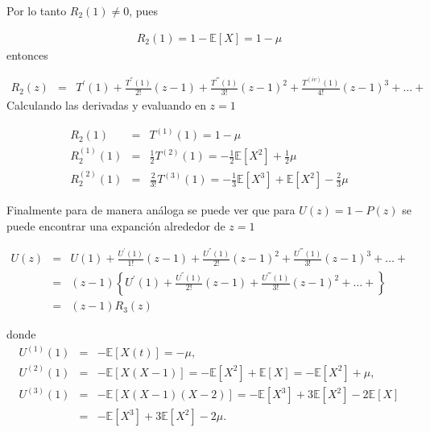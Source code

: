 \documentclass{article}
\newcommand{\esp}{\mathbb{E}}
\begin{document}
Por lo tanto $R_{2}\left(1\right)\neq0$, pues

\begin{eqnarray}\label{Eq.R2}
R_{2}\left(1\right)=1-\esp\left[X\right]=1-\mu
\end{eqnarray}
entonces

\begin{eqnarray}
R_{2}\left(z\right)&=&T^{'}\left(1\right)+\frac{T^{''}\left(1\right)}{2!}\left(z-1\right)+\frac{T^{'''}\left(1\right)}{3!}\left(z-1\right)^{2}+\frac{T^{(iv)}\left(1\right)}{4!}\left(z-1\right)^{3}+\ldots+
\end{eqnarray}
Calculando las derivadas y evaluando en $z=1$

\begin{eqnarray}
R_{2}\left(1\right)&=&T^{(1)}\left(1\right)=1-\mu\\
R_{2}^{(1)}\left(1\right)&=&\frac{1}{2}T^{(2)}\left(1\right)=-\frac{1}{2}\esp\left[X^{2}\right]+\frac{1}{2}\mu\\
R_{2}^{(2)}\left(1\right)&=&\frac{2}{3!}T^{(3)}\left(1\right)
=-\frac{1}{3}\esp\left[X^{3}\right]+\esp\left[X^{2}\right]-\frac{2}{3}\mu
\end{eqnarray}

Finalmente para de manera an\'aloga se puede ver que para $U\left(z\right)=1-P\left(z\right)$ se puede encontrar una expanci\'on alrededor de $z=1$

\begin{eqnarray*}
U\left(z\right)&=&U\left(1\right)+\frac{U^{'}\left(1\right)}{1!}\left(z-1\right)+\frac{U^{''}\left(1\right)}{2!}\left(z-1\right)^{2}+\frac{U^{'''}\left(1\right)}{3!}\left(z-1\right)^{3}+\ldots+\\
&=&\left(z-1\right)\left\{U^{'}\left(1\right)+\frac{U^{''}\left(1\right)}{2!}\left(z-1\right)+\frac{U^{'''}\left(1\right)}{3!}\left(z-1\right)^{2}+\ldots+\right\}\\
&=&\left(z-1\right)R_{3}\left(z\right)
\end{eqnarray*}

donde 
\begin{eqnarray*}
U^{(1)}\left(1\right)&=&-\esp\left[X\left(t\right)\right]=-\mu,\\ U^{(2)}\left(1\right)&=&-\esp\left[X\left(X-1\right)\right]
=-\esp\left[X^{2}\right]+\esp\left[X\right]=-\esp\left[X^{2}\right]+\mu,\\
U^{(3)}\left(1\right)&=&-\esp\left[X\left(X-1\right)\left(X-2\right)\right]
=-\esp\left[X^{3}\right]+3\esp\left[X^{2}\right]-2\esp\left[X\right]\\
&=&-\esp\left[X^{3}\right]+3\esp\left[X^{2}\right]-2\mu.
\end{eqnarray*}
\end{document}
